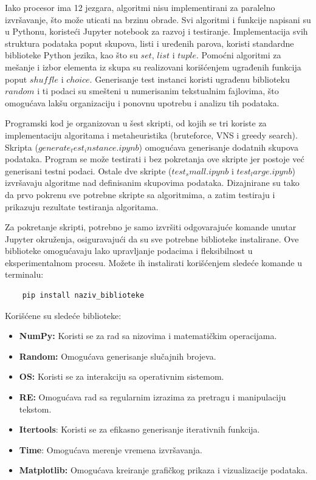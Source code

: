\documentclass[12pt,oneside]{memoir}
\begin{document}
Iako procesor ima 12 jezgara, algoritmi nisu implementirani za paralelno izvršavanje, što može uticati na brzinu obrade. Svi algoritmi i funkcije napisani su u Pythonu, koristeći Jupyter notebook za razvoj i testiranje. Implementacija svih struktura podataka poput skupova, listi i uređenih parova, koristi standardne biblioteke Python jezika, kao što su $set$, $list$ i $tuple$. Pomoćni algoritmi za mešanje i izbor elementa iz skupa su realizovani korišćenjem ugrađenih funkcija poput $shuffle$ i $choice$. Generisanje test instanci koristi ugrađenu biblioteku $random$ i ti podaci su smešteni u numerisanim tekstualnim fajlovima, što omogućava lakšu organizaciju i ponovnu upotrebu i analizu tih podataka.

Programski kod je organizovan u šest skripti, od kojih se tri koriste za implementaciju algoritama i metaheuristika (bruteforce, VNS i greedy search). Skripta ($generate_test_instance.ipynb$) omogućava generisanje dodatnih skupova podataka. Program se može testirati i bez pokretanja ove skripte jer postoje već generisani testni podaci. Ostale dve skripte ($test_small.ipynb$ i $test_large.ipynb$) izvršavaju algoritme nad definisanim skupovima podataka. Dizajnirane su tako da prvo pokrenu sve potrebne skripte sa algoritmima, a zatim testiraju i prikazuju rezultate testiranja algoritama.

Za pokretanje skripti, potrebno je samo izvršiti odgovarajuće komande unutar Jupyter okruženja, osiguravajući da su sve potrebne biblioteke instalirane. Ove biblioteke omogućavaju lako upravljanje podacima i fleksibilnost u eksperimentalnom procesu. Možete ih instalirati korišćenjem sledeće komande u terminalu:
\begin{verbatim}
    pip install naziv_biblioteke
\end{verbatim}
Korišćene su sledeće biblioteke: 
\begin{itemize}
    \item \textbf{NumPy:} Koristi se za rad sa nizovima i matematičkim operacijama.
    \item \textbf{Random:} Omogućava generisanje slučajnih brojeva.
    \item \textbf{OS:} Koristi se za interakciju sa operativnim sistemom.
    \item \textbf{RE:} Omogućava rad sa regularnim izrazima za pretragu i manipulaciju tekstom.
    \item \textbf{Itertools}: Koristi se za efikasno generisanje iterativnih funkcija.
    \item \textbf{Time}: Omogućava merenje vremena izvršavanja.
    \item \textbf{Matplotlib:} Omogućava kreiranje grafičkog prikaza i vizualizacije podataka.
\end{itemize}
\end{document}
